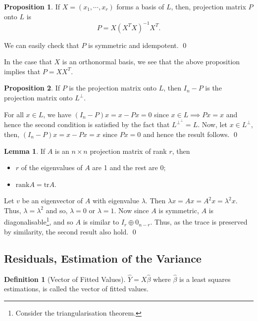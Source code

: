 \documentclass[
]{article}
\theoremstyle{definition}
\newtheorem{prop}{Proposition}
\theoremstyle{definition}
\newtheorem{definition}{Definition}[section]
\newtheorem{lemma}{Lemma}[section]
\begin{document}
\begin{prop}
  If \(X = (x_1, \cdots, x_r)\) forms a basis of \(L\), then, projection 
  matrix \(P\) onto \(L\) is
  \[P = X(X^T X)^{-1} X^T.\]
\end{prop}
\proof

We can easily check that \(P\) is symmetric and idempotent. \qed

In the case that \(X\) is an orthonormal basis, we see that the above
proposition implies that \(P = X X^T\).

\begin{prop}
  If \(P\) is the projection matrix onto \(L\), then \(I_n - P\) is the projection 
  matrix onto \(L^\perp\).
\end{prop}
\proof

For all \(x \in L\), we have \((I_n - P) x = x - Px = 0\) since
\(x \in L \implies P x = x\) and hence the second condition is satisfied
by the fact that \(L^{\perp^\perp} = L\). Now, let \(x \in L^\perp\),
then, \((I_n - P) x = x - Px = x\) since \(Px = 0\) and hence the result
follows. \qed

\begin{lemma}
  If \(A\) is an \(n \times n\) projection matrix of rank \(r\), then 
  \begin{itemize}
    \item \(r\) of the eigenvalues of \(A\) are 1 and the rest are 0;
    \item \(\text{rank} A = \text{tr} A\).
  \end{itemize}
\end{lemma}
\proof

Let \(v\) be an eigenvector of \(A\) with eigenvalue \(\lambda\). Then
\(\lambda x = A x = A^2 x = \lambda^2 x\). Thus, \(\lambda = \lambda^2\)
and so, \(\lambda = 0\) or \(\lambda = 1\). Now since \(A\) is
symmetric, \(A\) is
diagonalisable\footnote{Consider the triangularisation theorem.}, and so
\(A\) is similar to \(I_r \oplus 0_{n - r}\). Thus, as the trace is
preserved by similarity, the second result also hold. \qed

\hypertarget{residuals-estimation-of-the-variance}{%
\subsection{Residuals, Estimation of the
Variance}\label{residuals-estimation-of-the-variance}}

\begin{definition}[Vector of Fitted Values]
  \(\hat Y = X \hat \beta\) where \(\hat \beta\) is a least squares estimations, 
  is called the vector of fitted values.
\end{definition}
\end{document}
